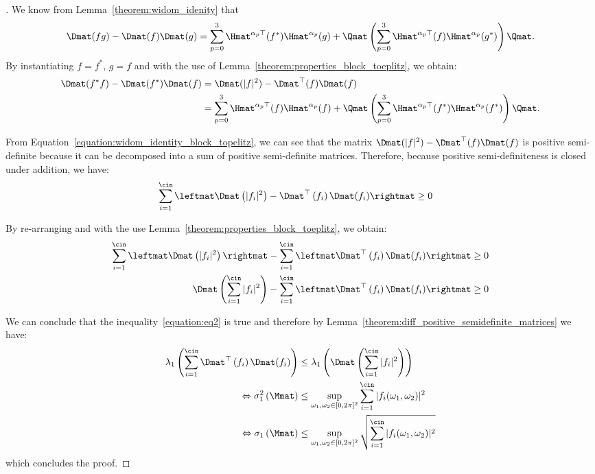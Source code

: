 \begin{proof}[]
We know from Lemma~\ref{theorem:widom_idenity} that 
\begin{equation}
    \Dmat(fg) - \Dmat(f)\Dmat(g) = \sum_{p=0}^3 \Hmat^{\alpha_p \top}(f^*) \Hmat^{\alpha_p}(g) + \Qmat \left( \sum_{p=0}^3 \Hmat^{\alpha_p \top}(f) \Hmat^{\alpha_p}(g^*) \right) \Qmat.
\end{equation}
By instantiating $f = f^*$, $g = f$ and with the use of Lemma~\ref{theorem:properties_block_toeplitz}, we obtain:
\begin{align}
    \Dmat(f^* f) - \Dmat(f^*)\Dmat(f)
    &= \Dmat(|f|^2) - \Dmat^{\top}(f)\Dmat(f) \\
    &= \sum_{p=0}^3 \Hmat^{\alpha_p \top}(f)\Hmat^{\alpha_p}(f) + \Qmat \left( \sum_{p=0}^3 \Hmat^{\alpha_p \top}(f^*)\Hmat^{\alpha_p} (f^*) \right) \Qmat . \label{equation:widom_identity_block_topelitz}
\end{align}

From Equation~\ref{equation:widom_identity_block_topelitz}, we can see that the matrix $\Dmat(|f|^2) - \Dmat^{\top}(f)\Dmat(f)$
is positive semi-definite because it can be decomposed into a sum of positive semi-definite matrices.
Therefore, because positive semi-definiteness is closed under addition, we have:
\begin{align}
    \sum_{i=1}^{\cin} \leftmat \Dmat \left( |f_i|^2 \right) - \Dmat^{\top} \left(f_i \right) \Dmat (f_i) \rightmat &\geq 0
\end{align}

By re-arranging and with the use Lemma~\ref{theorem:properties_block_toeplitz}, we obtain:
\begin{align}
   \sum_{i=1}^{\cin} \leftmat \Dmat \left( |f_i|^2 \right) \rightmat - \sum_{i=1}^{\cin} \leftmat \Dmat^{\top} \left(f_i \right) \Dmat (f_i) \rightmat &\geq 0 \\
    \Dmat \left( \sum_{i=1}^{\cin} |f_i|^2 \right) - \sum_{i=1}^{\cin} \leftmat \Dmat^{\top} \left(f_i \right) \Dmat (f_i) \rightmat &\geq 0
\end{align}


We can conclude that the inequality~\ref{equation:eq2} is true and therefore by Lemma~\ref{theorem:diff_positive_semidefinite_matrices} we have:
\begin{align}
    \lambda_1 \left( \sum_{i=1}^{\cin} \Dmat^{\top} \left(f_i \right) \Dmat (f_i) \right) &\leq \lambda_1 \left( \Dmat \left( \sum_{i=1}^{\cin} |f_i|^2 \right) \right) \\
    \Leftrightarrow \sigma_1^2 \left( \Mmat \right) &\leq \sup_{\omega_1, \omega_2 \in [0, 2\pi]^2} \sum_{i=1}^{\cin} |f_i(\omega_1, \omega_2)|^2 \\
    \Leftrightarrow \sigma_1 \left( \Mmat \right) &\leq \sup_{\omega_1, \omega_2 \in [0, 2\pi]^2} \sqrt{ \sum_{i=1}^{\cin} |f_i(\omega_1, \omega_2)|^2 }
\end{align}
which concludes the proof. 
\end{proof}


